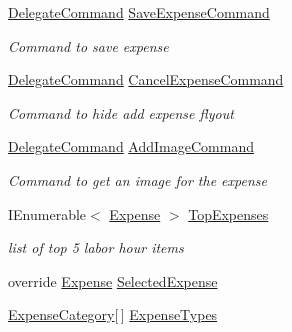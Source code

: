 \begin{DoxyCompactItemize}
\hyperlink{class_delegate_command}{Delegate\+Command} \hyperlink{class_field_service_1_1_win_r_t_1_1_view_models_1_1_expense_view_model_ae299e63006f07f92dce92d6a65e6a0fc}{Save\+Expense\+Command}
\begin{DoxyCompactList}\small\item\em Command to save expense \end{DoxyCompactList}\item 
\hyperlink{class_delegate_command}{Delegate\+Command} \hyperlink{class_field_service_1_1_win_r_t_1_1_view_models_1_1_expense_view_model_a601008e2d8e9993799deb6154247281f}{Cancel\+Expense\+Command}
\begin{DoxyCompactList}\small\item\em Command to hide add expense flyout \end{DoxyCompactList}\item 
\hyperlink{class_delegate_command}{Delegate\+Command} \hyperlink{class_field_service_1_1_win_r_t_1_1_view_models_1_1_expense_view_model_a81683be600c43401f03d224d6d956752}{Add\+Image\+Command}
\begin{DoxyCompactList}\small\item\em Command to get an image for the expense \end{DoxyCompactList}\item 
I\+Enumerable$<$ \hyperlink{class_field_service_1_1_data_1_1_expense}{Expense} $>$ \hyperlink{class_field_service_1_1_win_r_t_1_1_view_models_1_1_expense_view_model_a5dd8925c60ea704bcf6b8888b9ec8961}{Top\+Expenses}
\begin{DoxyCompactList}\small\item\em list of top 5 labor hour items \end{DoxyCompactList}\item 
override \hyperlink{class_field_service_1_1_data_1_1_expense}{Expense} \hyperlink{class_field_service_1_1_win_r_t_1_1_view_models_1_1_expense_view_model_a8afd09433c89eeb7d5f2e9d59d474647}{Selected\+Expense}
\item 
\hyperlink{namespace_field_service_1_1_data_a6565a839d23a4c941ba4a771c1e22163}{Expense\+Category}\mbox{[}$\,$\mbox{]} \hyperlink{class_field_service_1_1_win_r_t_1_1_view_models_1_1_expense_view_model_a39a14e1279b45629f67ee3c030688de2}{Expense\+Types}

\end{DoxyCompactItemize}
